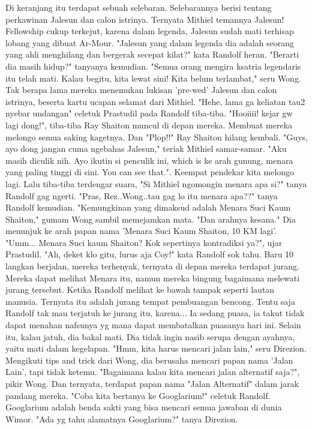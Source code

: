 \documentclass[a4paper,11pt,final]{article}
\begin{document}
Di keranjang itu terdapat sebuah selebaran. Selebarannya berisi tentang perkawinan Jalesun dan calon istrinya. Ternyata Mithiel temannya Jalesun! Fellowship cukup terkejut, karena dalam legenda, Jalesun sudah mati terhisap lobang yang dibuat Ar-Mour.
"Jalesun yang dalam legenda dia adalah seorang yang ahli menghilang dan bergerak secepat kilat?" kata Randolf heran. "Berarti dia masih hidup?" tanyanya kemudian.
"Semua orang mengira ksatria legendaris itu telah mati. Kalau begitu, kita lewat sini! Kita belum terlambat," seru Wong. Tak berapa lama mereka menemukan lukisan 'pre-wed' Jalesun dan calon istrinya, beserta kartu ucapan selamat dari Mithiel.
"Hehe, lama ga keliatan tau2 nyebar undangan" celetuk Prastudil pada Randolf tiba-tiba.
"Hooiiii! kejar gw lagi dong!", tiba-tiba Ray Shaiton muncul di depan mereka. Membuat mereka melongo semua saking kagetnya. Dan "Plop!!" Ray Shaiton hilang kembali.
"Guys, ayo dong jangan cuma ngebahas Jalesun," teriak Mithiel samar-samar. "Aku masih diculik nih. Ayo ikutin si penculik ini, which is ke arah gunung, menara yang paling tinggi di sini. You can see that.".
Keempat pendekar kita melongo lagi. Lalu tiba-tiba terdengar suara, "Si Mithiel ngomongin menara apa si?" tanya Randolf gag ngerti. "Pras, Rez..Wong..tau gag lo itu menara apa??" tanya Randolf kemudian.
"Kemungkinan yang dimaksud adalah Menara Suci Kaum Shaiton," gumam Wong sambil memejamkan mata. "Dan arahnya kesana." Dia menunjuk ke arah papan nama 'Menara Suci Kaum Shaiton, 10 KM lagi'.
"Umm... Menara Suci kaum Shaiton? Kok sepertinya kontradiksi ya?", ujar Prastudil.
"Ah, deket klo gitu, lurus aja Coy!" kata Randolf sok tahu. Baru 10 langkan berjalan, mereka terhenyak, ternyata di depan mereka terdapat jurang. Mereka dapat melihat Menara itu, namun mereka bingung bagaimana melewati jurang tersebut.
Ketika Randolf melihat ke bawah tampak seperti lautan manusia. Ternyata itu adalah jurang tempat pembuangan bencong. Tentu saja Randolf tak mau terjatuh ke jurang itu, karena...
Ia sedang puasa, ia takut tidak dapat menahan nafsunya yg mana dapat membatalkan puasanya hari ini.
Selain itu, kalau jatuh, dia bakal mati. Dia tidak ingin nasib serupa dengan ayahnya, yaitu mati dalam kegelapan.
"Hmm, kita harus mencari jalan lain," seru Direzion. Mengikuti tips and trick dari Wong, dia berusaha mencari papan nama 'Jalan Lain', tapi tidak ketemu.
"Bagaimana kalau kita mencari jalan alternatif saja?", pikir Wong. Dan ternyata, terdapat papan nama "Jalan Alternatif" dalam jarak pandang mereka.
"Coba kita bertanya ke Googlarium!" celetuk Randolf. Googlarium adalah benda sakti yang bisa mencari semua jawaban di dunia Wimor. "Ada yg tahu alamatnya Googlarium?" tanya Direzion.
\end{document}
